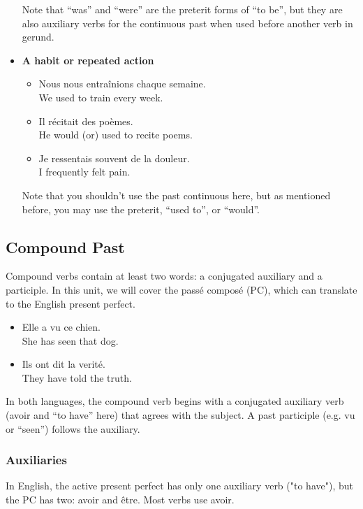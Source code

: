 \begin{itemize}
  Note that ``was'' and ``were'' are the preterit forms of ``to be'', but they are also auxiliary verbs for the continuous past when used before another verb in gerund.
	
	\item  \textbf{A habit or repeated action}
	
	\begin{itemize}
  \item  Nous nous entraînions chaque semaine. \\ We used to train every week.
	\item  Il r{\'e}citait des po{\`e}mes. \\ He would (or) used to recite poems.
	\item  Je ressentais souvent de la douleur. \\ I frequently felt pain.
\end{itemize}

  Note that you shouldn't use the past continuous here, but as mentioned before, you may use the preterit, ``used to'', or ``would''.
\end{itemize}


\pagebreak
\subsection{Compound Past}

Compound verbs contain at least two words: a conjugated auxiliary and a participle. In this unit, we will cover the pass{\'e} compos{\'e} (PC), which can translate to the English present perfect.

\begin{itemize}
  \item  Elle a vu ce chien. \\ She has seen that dog.
	\item  Ils ont dit la verit{\'e}. \\ They have told the truth.
\end{itemize}

In both languages, the compound verb begins with a conjugated auxiliary verb (avoir and ``to have'' here) that agrees with the subject. A past participle (e.g. vu or ``seen'') follows the auxiliary.

\subsubsection{Auxiliaries}

In English, the active present perfect has only one auxiliary verb ("to have"), but the PC has two: avoir and être. Most verbs use avoir.

